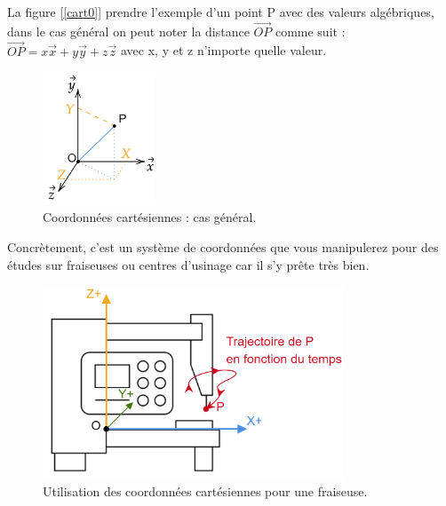\documentclass[
	11pt, %
	fleqn, %
	a4paper, %
]{LegrandOrangeBook}
\begin{document}
La figure [\ref{cart0}] prendre l'exemple d'un point P avec des valeurs algébriques, dans le cas général on peut noter la distance $\Vec{OP}$ comme suit : $\Vec{OP}=x\Vec{x}+y\Vec{y}+z\Vec{z}$ avec x, y et z n'importe quelle valeur.

\begin{figure}[H] %
	\centering %
	\includegraphics[width=0.3\textwidth]{Images/cart1.png} %
	\caption{Coordonnées cartésiennes : cas général.}
	\label{cart1} %
\end{figure}

Concrètement, c'est un système de coordonnées que vous manipulerez pour des études sur fraiseuses ou centres d'usinage car il s'y prête très bien.

\begin{figure}[H] %
	\centering %
	\includegraphics[width=0.8\textwidth]{Images/cart2.png} %
	\caption{Utilisation des coordonnées cartésiennes pour une fraiseuse.}
	\label{cart2} %
\end{figure}
\end{document}
